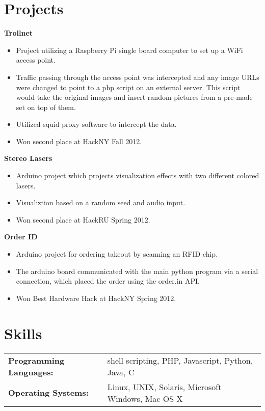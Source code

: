 \documentclass[centered,overlapped]{res}
\begin{document}
\begin{resume}

\section{Projects}

	{\bf Trollnet}
	\begin{itemize} \itemsep -2pt
		\item Project utilizing a Raspberry Pi single board computer to set up a WiFi access point.
		\item Traffic passing through the access point was intercepted and any image URLs were changed to point to a php script on an external server. This script would take the original images and insert random pictures from a pre-made set on top of them.
		\item Utilized squid proxy software to intercept the data.
		\item Won second place at HackNY Fall 2012.
	\end{itemize}

	{\bf Stereo Lasers}
	\begin{itemize} \itemsep -2pt
		\item Arduino project which projects visualization effects with two different colored lasers.
		\item Visualiztion based on a random seed and audio input.
		\item Won second place at HackRU Spring 2012.
	\end{itemize}

	{\bf Order ID}
	\begin{itemize} \itemsep -2pt
		\item Arduino project for ordering takeout by scanning an RFID chip.
		\item The arduino board communicated with the main python program via a serial connection, which placed the order using the order.in API.
		\item Won Best Hardware Hack at HackNY Spring 2012.
	\end{itemize}

\section{Skills}
	\begin{tabular}{l l}
		\noindent \textbf{Programming Languages:} & shell scripting, PHP, Javascript, Python, Java, C \\
		\noindent \textbf{Operating Systems:} & Linux, UNIX, Solaris, Microsoft Windows, Mac OS X \\
	\end{tabular}

\end{resume}
\end{document}
